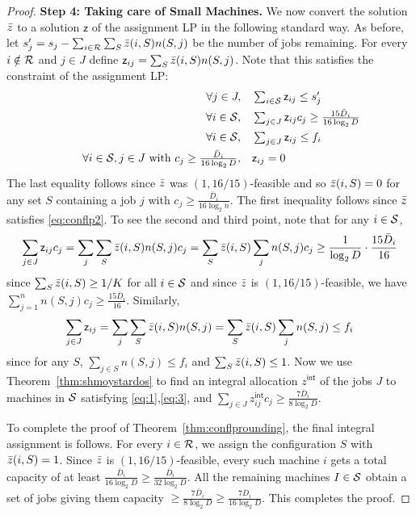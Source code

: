 \documentclass{article}[11pt]
\newcommand{\barD}{\bar{D}}
\begin{document}
\begin{proof}
	\noindent
	{\bf Step 4: Taking care of Small Machines.} 
	\def\zz{z^{\mathsf{int}}}
	\def\2z{\mathsf z}
	We now convert the solution $\bar z$  to a solution $\2z$ of the assignment LP in the following standard way.
	As before, let $s'_j = s_j - \sum_{i\in {\cal R}}\sum_S \bar z(i,S)n(S,j)$ be the number of jobs remaining.
	For every $i\notin {\cal R}$ and $j\in J$ define $\2z_{ij} = \sum_{S}\z(i,S)n(S,j)$.  Note that this satisfies the constraint of the assignment LP:
	\begin{alignat}{4}
		&& \quad \forall j \in J,   &\quad  \textstyle \sum_{i\in \calS} \2z_{ij}  \leq  s'_j \label{eq:1} \\
		&& \quad \forall i\in \calS ,      &\quad  \textstyle \sum_{j\in J}  \2z_{ij}c_j \geq \frac{15\barD_i}{16\log_2 D} \label{eq:2} \\
		&& \quad \forall i\in \calS ,      &\quad  \textstyle \sum_{j\in J}  \2z_{ij} \leq f_i \label{eq:3} \\ 
		&& \quad \forall i\in \calS, j\in J~\textrm{with}~ \textstyle c_j \geq \frac{\barD_i}{16\log_2 D}, & \quad \2z_{ij}   =  0  \label{eq:4} 
	\end{alignat}
	The last equality follows since $\bar z$ was $(1,16/15)$-feasible and so $\bar z(i,S) = 0$ for any set $S$ containing a job $j$ with $c_j \geq \frac{\barD_i}{16\log_2 n}$.
	The first inequality follows  since $\bar z$ satisfies \eqref{eq:conflp2}. To see the second and third point, note 
	that for any $i\in {\cal S}$,
	\[
	\sum_{j\in J} \2z_{ij}c_j = \sum_j \sum_S \z(i,S)n(S,j)c_j = \sum_S \z(i,S) \sum_j n(S,j)c_j \geq \frac{1}{\log_2 D}\cdot \frac{15\barD_i}{16}
	\]
	since $\sum_S \bar z(i,S) \geq 1/K$ for all $i\in {\cal S}$ and since $\bar z$ is $(1,16/15)$-feasible, we have $\sum_{j=1}^n n(S,j) c_j \geq \frac{15\barD_i}{16}$. Similarly,
	\[
	\sum_{j\in J} \2z_{ij} = \sum_j \sum_S \z(i,S)n(S,j) = \sum_S \z(i,S) \sum_j n(S,j) \leq f_i
	\]
	since for any $S$, $\sum_{j\in S} n(S,j) \leq f_i$ and $\sum_S \bar z(i,S) \leq 1$.
	Now we use Theorem~\ref{thm:shmoystardos} to find an integral allocation $\zz$ of the jobs $J$ to machines in ${\cal S}$ satisfying \eqref{eq:1},\eqref{eq:3}, and $\sum_{j\in J} \zz_{ij}c_j \geq \frac{7\barD_i}{8\log_2 D}$. \medskip
	
	To complete the proof of Theorem~\ref{thm:conflprounding}, the final integral assignment is follows. For every $i\in {\cal R}$, we assign the configuration $S$ with $\bar z(i,S) = 1$.
	Since $\bar z$ is $(1,16/15)$-feasible, every such machine $i$ gets a total capacity of at least $\frac{\barD_i}{16\log_2 D} \geq \frac{\barD_i}{32\log_2 D}$.
	All the remaining machines $I\in {\cal S}$ obtain a set of jobs giving them capacity $\geq \frac{7\barD_i}{8\log_2 D} \geq \frac{7D_i}{16\log_2 D}$.
	This completes the proof.
\end{proof}
\end{document}
